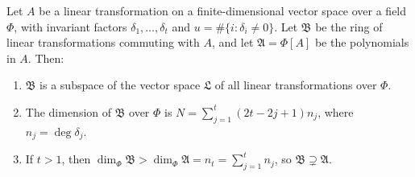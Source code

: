 Let $A$ be a linear transformation on a finite-dimensional vector space over a field $\Phi$, with invariant factors $\delta_1, \ldots, \delta_t$ and $u = \#\{i : \delta_i \neq 0\}$. Let $\mathfrak{B}$ be the ring of linear transformations commuting with $A$, and let $\mathfrak{A} = \Phi[A]$ be the polynomials in $A$. Then:
\begin{enumerate}
\item $\mathfrak{B}$ is a subspace of the vector space $\mathfrak{L}$ of all linear transformations over $\Phi$.
\item The dimension of $\mathfrak{B}$ over $\Phi$ is $N = \sum_{j=1}^{t} (2t - 2j + 1) n_j$, where $n_j = \deg \delta_j$.
\item If $t > 1$, then $\dim_\Phi \mathfrak{B} > \dim_\Phi \mathfrak{A} = n_t = \sum_{j=1}^{t} n_j$, so $\mathfrak{B} \supsetneq \mathfrak{A}$.
\end{enumerate}
